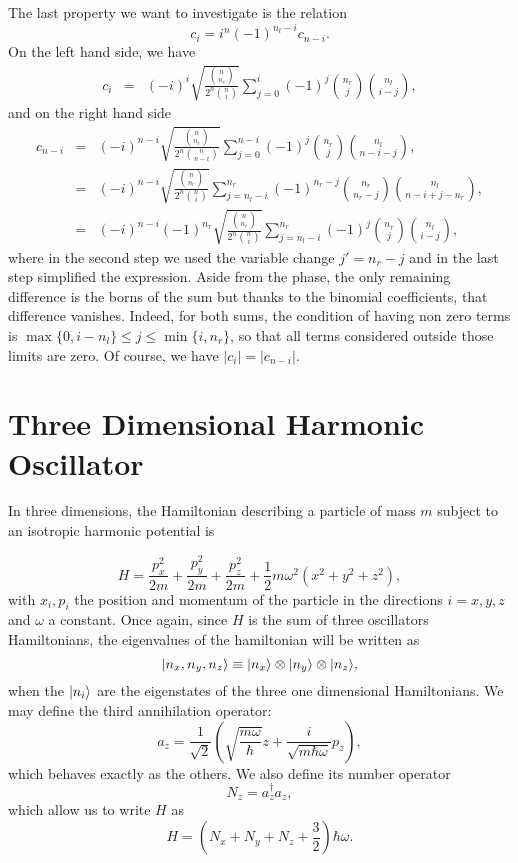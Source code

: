 The last property we want to investigate is the relation
\[ c_i = i^n (-1)^{n_l-i} c_{n-i} . \]
On the left hand side, we have
\begin{eqnarray}
c_i&=& (-i)^i  \sqrt{\frac{\binom{n}{n_r} }{2^n \binom{n}{i}}}  \sum_{j=0}^{i}(-1)^j \binom{n_r}{j} \binom{n_l}{i-j} ,
\end{eqnarray}
and on the right hand side
\begin{eqnarray}
c_{n-i}&=&  (-i)^{n-i} \sqrt{\frac{\binom{n}{n_r} }{2^n \binom{n}{n-i}}}    \sum_{j=0}^{n-i}(-1)^j \binom{n_r}{j} \binom{n_l}{n-i-j} , \\
&=&  (-i)^{n-i}  \sqrt{\frac{\binom{n}{n_r} }{2^n \binom{n}{i}}}    \sum_{j=n_l-i}^{n_r}(-1)^{n_r-j} \binom{n_r}{n_r-j} \binom{n_l}{n-i+j-n_r} , \\
&=&  (-i)^{n-i} (-1)^{n_r}  \sqrt{\frac{\binom{n}{n_r} }{2^n \binom{n}{i}}}    \sum_{j=n_l-i}^{n_r}(-1)^{j} \binom{n_r}{j} \binom{n_l}{i-j} ,
\end{eqnarray}
where in the second step we used the variable change $j'=n_r-j$ and in the last step simplified the expression. Aside from the phase, the only remaining difference is the borns of the sum but thanks to the binomial coefficients, that difference vanishes. Indeed, for both sums, the condition of having non zero terms is $\max\{ 0, i- n_l\} \le j \le \min\{ i,n_r \} $, so that all terms considered outside those limits are zero. Of course, we have $|c_i|=|c_{n-i}|$.


\section{Three Dimensional Harmonic Oscillator}

In three dimensions, the Hamiltonian describing a particle of mass $m$ subject to an isotropic harmonic potential is

\[ H =  \frac{p_x^2}{2m}+\frac{p_y^2}{2m} + \frac{p_z^2}{2m}+ \frac 1 2 m \omega^2 \left( x^2 + y^2 +z^2\right),\]
with $x_i, p_i$ the position and momentum of the particle in the directions $i=x,y,z$ and $\omega$ a constant. Once again, since $H$ is the sum of three oscillators Hamiltonians, the eigenvalues of the hamiltonian will be written as
\[ | n_x, n_y,n_z \rangle \equiv | n_x \rangle \otimes | n_y \rangle \otimes | n_z \rangle, \]
when the $| n_i \rangle$ are the eigenstates of the three one dimensional Hamiltonians. We may define the third annihilation operator:
\[ a_z = \frac{1}{\sqrt 2} \left( \sqrt{\frac{m\omega}{\hbar}} z + \frac{i}{\sqrt{m \hbar \omega}} p_z \right),\]
which behaves exactly as the others. We also define its number operator
\[ N_z = a_z^\dagger a_z, \]
which allow us to write $H$ as
\[ H = \left(N_x + N_y + N_z +\frac 3 2 \right) \hbar \omega. \]


